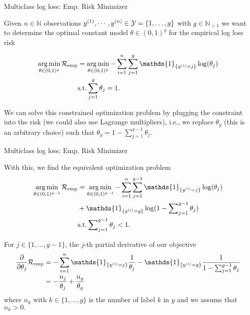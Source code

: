 \documentclass[11pt,compress,t,notes=noshow, xcolor=table]{beamer}
\newcommand{\argminl}{\mathop{\operatorname{arg\,min}}\limits}
\begin{document}
\begin{framei}{Multiclass log loss: Emp. Risk Minimizer}

\item Given $n \in \mathbb{N}$ observations $y^{(1)}, \cdots, y^{(n)} \in \mathcal{Y} = \{1, \dots, g\}$ with $g\in\mathbb{N}_{>1}$ we want to determine the optimal constant model $\theta \in (0,1)^g$ for the empirical log loss risk

\begin{align*}
  \argminl_{\theta \in (0, 1)^g}\riske   &= 
  \argminl_{\theta \in (0, 1)^g}-\sum^n_{i=1}\sum^g_{j=1} \mathds{1}_{\{y^{(i)} = j\}}\log(\theta_j) \\
  &\text{s.t.} \sum^g_{j=1}\theta_j = 1.
\end{align*}

\item We can solve this constrained optimization problem by plugging the constraint into the risk (we could also use Lagrange multipliers), i.e., we replace $\theta_g$ (this is an arbitrary choice) such that $
 \theta_g = 1 - \sum^{g-1}_{j=1}\theta_j.$

\end{framei}
\begin{framei}{Multiclass log loss: Emp. Risk Minimizer}
\item With this, we find the equivalent optimization problem
\begin{align*}
  \argminl_{\theta \in (0, 1)^{g-1}}\riske & = \argminl_{\theta \in (0, 1)^{g-1}}
  -\sum^n_{i=1}\sum^{g-1}_{j=1} \mathds{1}_{\{y^{(i)} = j\}}\log(\theta_j) \\ 
  &+ \mathds{1}_{\{y^{(i)} = g\}}\log(1 - \sum\nolimits^{g-1}_{j=1}\theta_j) \\
  &\text{s.t.}  \sum\nolimits^{g-1}_{j=1}\theta_j < 1.
\end{align*}

\item For $j \in \{1,\dots,g-1\}$, the $j$-th partial derivative of our objective 
\begin{align*}
 \frac{\partial}{\partial \theta_j}\riske & = 
  -\sum^n_{i=1} \mathds{1}_{\{y^{(i)} = j\}}\frac{1}{\theta_j} - \mathds{1}_{\{y^{(i)} = g\}}\frac{1}{1 - \sum^{g-1}_{j=1}\theta_j} \\
 & = -\frac{n_j}{\theta_j} + \frac{n_g}{\theta_g}
\end{align*}
where $n_k$ with $k\in \{1,\dots, g\}$ is the number of label $k$ in $y$ and we assume that $n_k > 0.$

\end{framei}
\end{document}
